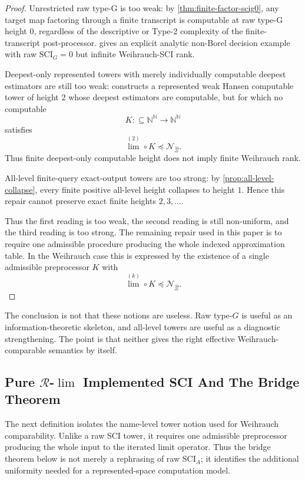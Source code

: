 \documentclass{lmcs} %
\theoremstyle{plain}
\theoremstyle{plain}
\theoremstyle{definition}
\theoremstyle{remark}
\theoremstyle{definition}
\theoremstyle{remark}
\numberwithin{equation}{section}
\newcommand{\Lim}{\operatorname{lim}}
\newcommand{\Limi}[1]{\Lim^{(#1)}}
\newcommand{\SCIG}{\mathrm{SCI}_G}
\newcommand{\SCIA}{\mathrm{SCI}_A}
\begin{document}
\begin{proof}
Unrestricted raw type-G is too weak: by \cref{thm:finite-factor-scig0}, any target map factoring through a finite transcript is computable at raw type-G height \(0\), regardless of the descriptive or Type-2 complexity of the finite-transcript post-processor.  gives an explicit analytic non-Borel decision example with raw \(\SCIG=0\) but infinite Weihrauch-SCI rank.

Deepest-only represented towers with merely individually computable deepest estimators are still too weak:  constructs a represented weak Hansen computable tower of height \(2\) whose deepest estimators are computable, but for which no computable
\[
        K:\subseteq\mathbb N^{\mathbb N}\to\mathbb N^{\mathbb N}
\]
satisfies
\[
        \Limi{2} \circ K\preceq \mathcal N_{\widehat{\Xi}}.
\]
Thus finite deepest-only computable height does not imply finite Weihrauch rank.

All-level finite-query exact-output towers are too strong: by \cref{prop:all-level-collapse}, every finite positive all-level height collapses to height \(1\). Hence this repair cannot preserve exact finite heights \(2,3,\ldots\).

Thus the first reading is too weak, the second reading is still non-uniform, and the third reading is too strong. The remaining repair used in this paper is to require one admissible procedure producing the whole indexed approximation table. In the Weihrauch case this is expressed by the existence of a single admissible preprocessor \(K\) with
\[
        \Limi{k} \circ K\preceq \mathcal N_{\widehat{\Xi}}.
\]
\end{proof}

The conclusion is not that these notions are useless. Raw type-\(G\) is useful as an
information-theoretic skeleton, and all-level towers are useful as a diagnostic
strengthening. The point is that neither gives the right effective Weihrauch-comparable
semantics by itself.

\subsection{Pure \texorpdfstring{\(\mathcal R\)-\(\Lim\)}{R-Lim} Implemented SCI And The Bridge Theorem}\label{sec:pure-R-lim}
The next definition isolates the name-level tower notion used for Weihrauch comparability.
Unlike a raw SCI tower, it requires one admissible preprocessor producing the whole input
to the iterated limit operator. Thus the bridge theorem below is not merely a rephrasing of raw \(\SCIA\); it identifies the additional uniformity needed for a represented-space computation model.
\end{document}
